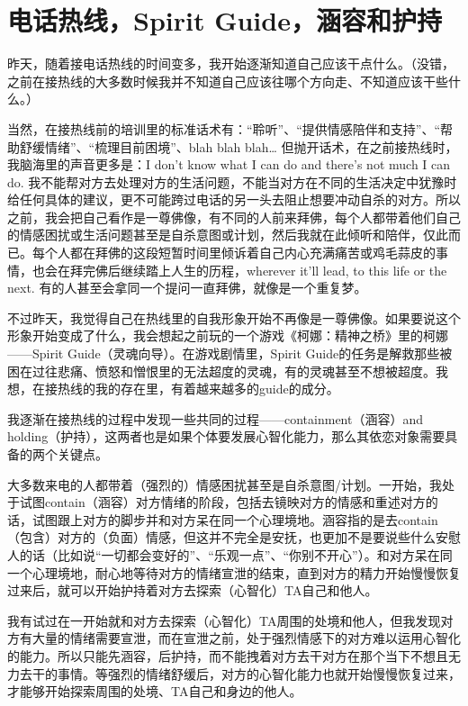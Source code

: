 \chapter{电话热线，Spirit Guide，涵容和护持}

昨天，随着接电话热线的时间变多，我开始逐渐知道自己应该干点什么。（没错，之前在接热线的大多数时候我并不知道自己应该往哪个方向走、不知道应该干些什么。）

当然，在接热线前的培训里的标准话术有：“聆听”、“提供情感陪伴和支持”、“帮助舒缓情绪”、“梳理目前困境”、blah blah blah… 但抛开话术，在之前接热线时，我脑海里的声音更多是：I don't know what I can do and there's not much I can do. 我不能帮对方去处理对方的生活问题，不能当对方在不同的生活决定中犹豫时给任何具体的建议，更不可能跨过电话的另一头去阻止想要冲动自杀的对方。所以之前，我会把自己看作是一尊佛像，有不同的人前来拜佛，每个人都带着他们自己的情感困扰或生活问题甚至是自杀意图或计划，然后我就在此倾听和陪伴，仅此而已。每个人都在拜佛的这段短暂时间里倾诉着自己内心充满痛苦或鸡毛蒜皮的事情，也会在拜完佛后继续踏上人生的历程，wherever it'll lead, to this life or the next. 有的人甚至会拿同一个提问一直拜佛，就像是一个重复梦。

不过昨天，我觉得自己在热线里的自我形象开始不再像是一尊佛像。如果要说这个形象开始变成了什么，我会想起之前玩的一个游戏《柯娜：精神之桥》里的柯娜——Spirit Guide（灵魂向导）。在游戏剧情里，Spirit Guide的任务是解救那些被困在过往悲痛、愤怒和憎恨里的无法超度的灵魂，有的灵魂甚至不想被超度。我想，在接热线的我的存在里，有着越来越多的guide的成分。

我逐渐在接热线的过程中发现一些共同的过程——containment（涵容）and holding（护持），这两者也是如果个体要发展心智化能力，那么其依恋对象需要具备的两个关键点。

大多数来电的人都带着（强烈的）情感困扰甚至是自杀意图/计划。一开始，我处于试图contain（涵容）对方情绪的阶段，包括去镜映对方的情感和重述对方的话，试图跟上对方的脚步并和对方呆在同一个心理境地。涵容指的是去contain（包含）对方的（负面）情感，但这并不完全是安抚，也更加不是要说些什么安慰人的话（比如说“一切都会变好的”、“乐观一点”、“你别不开心”）。和对方呆在同一个心理境地，耐心地等待对方的情绪宣泄的结束，直到对方的精力开始慢慢恢复过来后，就可以开始护持着对方去探索（心智化）TA自己和他人。

我有试过在一开始就和对方去探索（心智化）TA周围的处境和他人，但我发现对方有大量的情绪需要宣泄，而在宣泄之前，处于强烈情感下的对方难以运用心智化的能力。所以只能先涵容，后护持，而不能拽着对方去干对方在那个当下不想且无力去干的事情。等强烈的情绪舒缓后，对方的心智化能力也就开始慢慢恢复过来，才能够开始探索周围的处境、TA自己和身边的他人。

